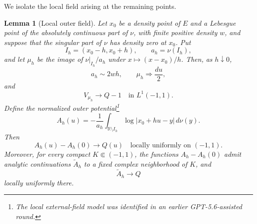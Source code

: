 \documentclass[11pt]{article}
\newtheorem{lemma}[theorem]{Lemma}
\theoremstyle{definition}
\numberwithin{equation}{section}
\newcommand{\R}{\mathbb R}
\begin{document}
We isolate the local field arising at the remaining points.

\begin{lemma}[Local outer field]\label{lem:local-outer-field}
Let \(x_0\) be a density point of \(E\) and a Lebesgue point of the
absolutely continuous part of \(\nu\), with finite positive density
\(w\), and suppose that the singular part of \(\nu\) has density zero
at \(x_0\). Put
\[
 I_h=(x_0-h,x_0+h),\qquad a_h=\nu(I_h),
\]
and let \(\mu_h\) be the image of \(\nu|_{I_h}/a_h\) under
\(x\mapsto(x-x_0)/h\). Then, as \(h\downarrow0\),
\[
 a_h\sim2wh,\qquad \mu_h\Longrightarrow \frac{du}{2},
\]
and
\begin{equation}\label{eq:inner-potential}
 V_{\mu_h}\longrightarrow Q-1
 \quad\text{in }L^1(-1,1).
\end{equation}
Define the normalized outer potential\footnote{The local external-field
model was identified in an earlier GPT-5.6-assisted round.}
\[
 A_h(u)=-\frac1{a_h}
 \int_{\R\setminus I_h}\log|x_0+hu-y|\,d\nu(y).
\]
Then
\begin{equation}\label{eq:real-field-limit}
 A_h(u)-A_h(0)\longrightarrow Q(u)
 \quad\text{locally uniformly on }(-1,1).
\end{equation}
Moreover, for every compact \(K\Subset(-1,1)\), the functions
\(A_h-A_h(0)\) admit analytic continuations \(\widetilde A_h\) to a
fixed complex neighborhood of \(K\), and
\[
 \widetilde A_h\longrightarrow Q
\]
locally uniformly there.
\end{lemma}
\end{document}
